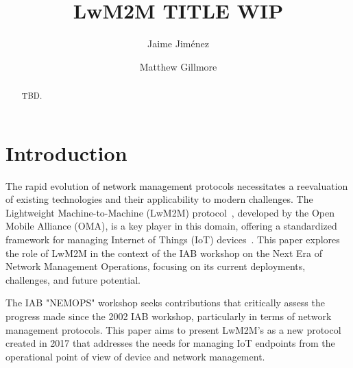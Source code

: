 \documentclass[11pt,sigconf]{iabart}
\begin{document}
\title{LwM2M TITLE WIP}

\author{Jaime Jiménez}
\author{Matthew Gillmore}

\begin{abstract}
TBD.

\end{abstract}


\maketitle

\section{Introduction} \label{introduction}



The rapid evolution of network management protocols necessitates a reevaluation of existing technologies and their applicability to modern challenges. The Lightweight Machine-to-Machine (LwM2M) protocol~\cite{lwm2m-spec}, developed by the Open Mobile Alliance (OMA), is a key player in this domain, offering a standardized framework for managing Internet of Things (IoT) devices~\cite{oma-sdo}. This paper explores the role of LwM2M in the context of the IAB workshop on the Next Era of Network Management Operations, focusing on its current deployments, challenges, and future potential.

The IAB "NEMOPS" workshop seeks contributions that critically assess the progress made since the 2002 IAB workshop, particularly in terms of network management protocols. This paper aims to present LwM2M's as a new protocol created in 2017 that addresses the needs for managing IoT endpoints from the operational point of view of device and network management.
\end{document}
